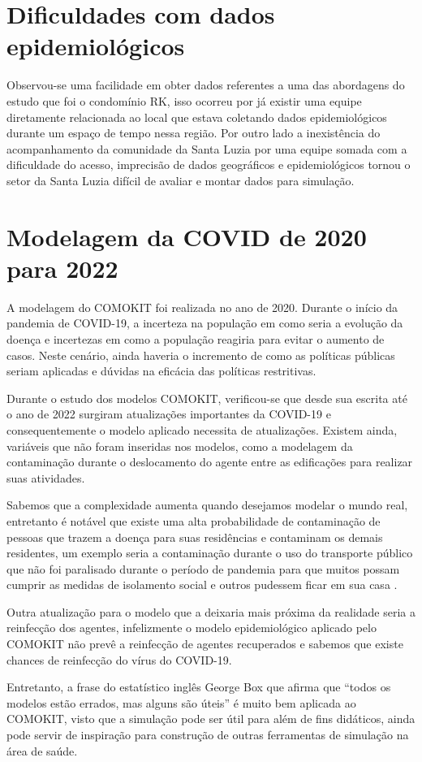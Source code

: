 \section{Dificuldades com dados epidemiológicos}

Observou-se uma facilidade em obter dados referentes a uma das abordagens do estudo que foi o condomínio RK, isso ocorreu por já existir uma equipe diretamente relacionada ao local que estava coletando dados epidemiológicos durante um espaço de tempo nessa região. Por outro lado a inexistência do acompanhamento da comunidade da Santa Luzia por uma equipe somada com a dificuldade do acesso, imprecisão de dados geográficos e epidemiológicos tornou o setor da Santa Luzia difícil de avaliar e montar dados para simulação.

\section{Modelagem da COVID de 2020 para 2022}

A modelagem do COMOKIT foi realizada no ano de 2020. Durante o início da pandemia de COVID-19, a incerteza na população em como seria a evolução da doença e incertezas em como a população reagiria para evitar o aumento de casos. Neste cenário, ainda haveria o incremento de como as políticas públicas seriam aplicadas e dúvidas na eficácia das políticas restritivas. 

Durante o estudo dos modelos COMOKIT, verificou-se que desde sua escrita até o ano de 2022 surgiram atualizações importantes da COVID-19 e consequentemente o modelo aplicado necessita de atualizações. Existem ainda, variáveis que não foram inseridas nos modelos, como a modelagem da contaminação durante o deslocamento do agente entre as edificações para realizar suas atividades.

Sabemos que a complexidade aumenta quando desejamos modelar o mundo real, entretanto é notável que existe uma alta probabilidade de contaminação de pessoas que trazem a doença para suas residências e contaminam os demais residentes, um exemplo seria a contaminação durante o uso do transporte público que não foi paralisado durante o período de pandemia para que muitos possam cumprir as medidas de isolamento social e outros pudessem ficar em sua casa \cite{}.

Outra atualização para o modelo que a deixaria mais próxima da realidade seria a reinfecção dos agentes, infelizmente o modelo epidemiológico aplicado pelo COMOKIT não prevê a reinfecção de agentes recuperados e sabemos que existe chances de reinfecção do vírus do COVID-19.

Entretanto, a frase do estatístico inglês George Box que afirma que “todos os modelos estão errados, mas alguns são úteis” é muito bem aplicada ao COMOKIT, visto que a simulação pode ser útil para além de fins didáticos, ainda pode servir de inspiração para construção de outras ferramentas de simulação na área de saúde.





